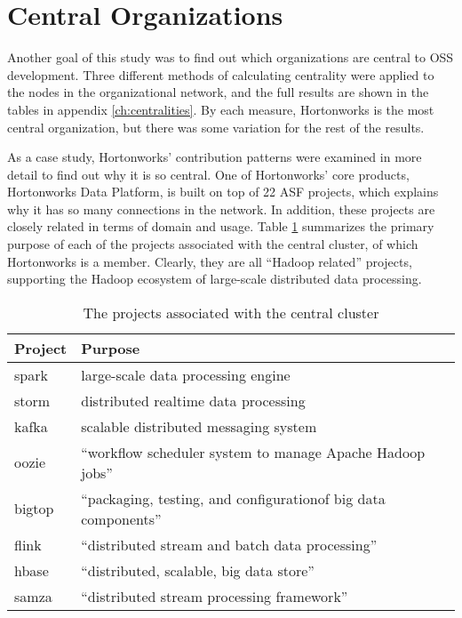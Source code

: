 \section{Central Organizations}
Another goal of this study was to find out which organizations are central to OSS development. Three different methods of calculating centrality were applied to the nodes in the organizational network, and the full results are shown in the tables in appendix \ref{ch:centralities}. By each measure, Hortonworks is the most central organization, but there was some variation for the rest of the results.


As a case study, Hortonworks' contribution patterns were examined in more detail to find out why it is so central. One of Hortonworks' core products, Hortonworks Data Platform, is built on top of 22 ASF projects\cite{hdp}, which explains why it has so many connections in the network. In addition, these projects are closely related in terms of domain and usage. Table \ref{tab:centralclusterprojects} summarizes the primary purpose of each of the projects associated with the central cluster, of which Hortonworks is a member. Clearly, they are all ``Hadoop related'' projects\cite{hadoopecosystem}, supporting the Hadoop ecosystem of large-scale distributed data processing.

\begin{table}
	\begin{tabular}{l|l}
		\bfseries Project & \bfseries Purpose \\
		\hline
		spark & large-scale data processing engine\cite{spark} \\
		storm & distributed realtime data processing\cite{storm} \\
		kafka & scalable distributed messaging system\cite{kafka} \\
		oozie & ``workflow scheduler system to manage Apache Hadoop jobs''\cite{oozie} \\
		bigtop & ``packaging, testing, and configuration\textellipsis{}of big data components''\cite{bigtop} \\
		flink & ``distributed stream and batch data processing''\cite{flink} \\
		hbase & ``distributed, scalable, big data store''\cite{hbase} \\
		samza & ``distributed stream processing framework''\cite{samza}
	\end{tabular}
	\centering
	\caption{The projects associated with the central cluster}\label{tab:centralclusterprojects}
\end{table}

